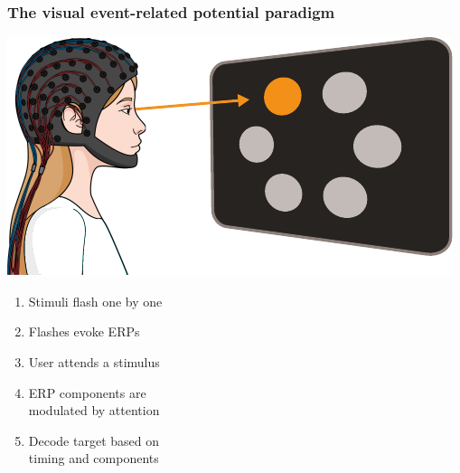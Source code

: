 \documentclass{kul-ulille-beamer}
\begin{document}
\begin{frame}
  \frametitle{The visual event-related potential  paradigm}
  \begin{minipage}[c]{.4\textwidth}
    \smallskip

    \includegraphics[width=\textwidth]{figures/intro/oddball.pdf}
  \end{minipage}\hfill%
  \begin{minipage}[c]{.5\textwidth}
    \begin{enumerate}
      \item Stimuli flash one by one
      \smallskip
      \item Flashes evoke ERPs
      \smallskip
      \item User attends a stimulus
      \smallskip
      \item ERP components are \\ modulated by attention
      \smallskip
      \item Decode target based on \\ timing and components
    \end{enumerate}
  \end{minipage}
\end{frame}


\end{document}
